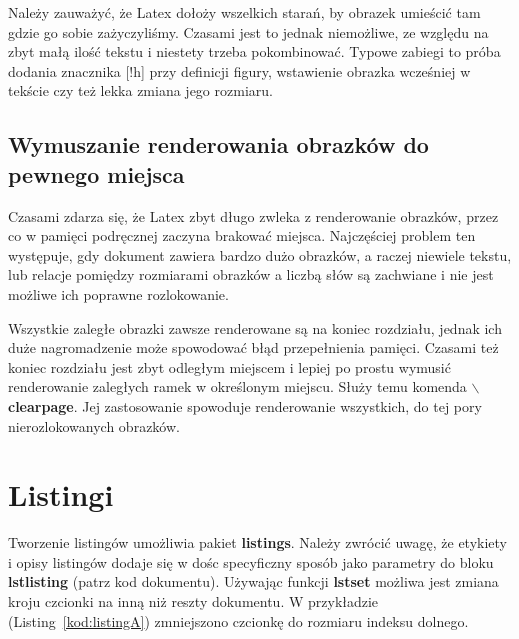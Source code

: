 \documentclass[twoside,a4paper]{book}
\begin{document}



Należy zauważyć, że Latex dołoży wszelkich starań, by obrazek umieścić tam gdzie go sobie zażyczyliśmy. Czasami jest to jednak niemożliwe, ze względu na zbyt małą ilość tekstu i niestety trzeba pokombinować. Typowe zabiegi to próba dodania znacznika [!h] przy definicji figury, wstawienie obrazka wcześniej w tekście czy też lekka zmiana jego rozmiaru.

\subsection{Wymuszanie renderowania obrazków do pewnego miejsca}

Czasami zdarza się, że Latex zbyt długo zwleka z renderowanie obrazków, przez co w pamięci podręcznej zaczyna brakować miejsca. Najczęściej problem ten występuje, gdy dokument zawiera bardzo dużo obrazków, a raczej niewiele tekstu, lub relacje pomiędzy rozmiarami obrazków a liczbą słów są zachwiane i nie jest możliwe ich poprawne rozlokowanie.

Wszystkie zaległe obrazki zawsze renderowane są na koniec rozdziału, jednak ich duże nagromadzenie może spowodować błąd przepełnienia pamięci. Czasami też koniec rozdziału jest zbyt odległym miejscem i lepiej po prostu wymusić renderowanie zaległych ramek w określonym miejscu. Służy temu komenda \textbf{$\backslash$clearpage}. Jej zastosowanie spowoduje renderowanie wszystkich, do tej pory nierozlokowanych obrazków.

\section{Listingi}
\label{listingi}
\enlargethispage{-5cm}
Tworzenie listingów umożliwia pakiet \textbf{listings}. Należy zwrócić uwagę, że etykiety i opisy listingów dodaje się w dośc specyficzny sposób jako parametry do bloku \textbf{lstlisting} (patrz kod dokumentu). Używając funkcji \textbf{lstset} możliwa jest zmiana kroju czcionki na inną niż reszty dokumentu. W przykładzie (Listing~\ref{kod:listingA}) zmniejszono czcionkę do rozmiaru indeksu dolnego.
\end{document}
